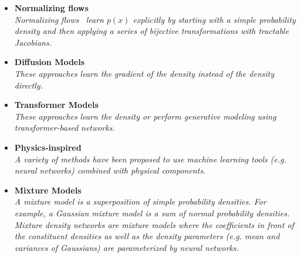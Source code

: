 \documentclass[12pt,letterpaper]{article}
\begin{document}
\begin{itemize}
\begin{itemize}
		\item \textbf{Normalizing flows}~\cite{Albergo:2019eim,1800956,Kanwar:2003.06413,Brehmer:2020vwc,Bothmann:2020ywa,Gao:2020zvv,Gao:2020vdv,Nachman:2020lpy,Choi:2020bnf,Lu:2020npg,Bieringer:2020tnw,Hollingsworth:2021sii,Winterhalder:2021ave,Krause:2021ilc,Hackett:2021idh,Menary:2021tjg,Hallin:2021wme,NEURIPS2020_a878dbeb,Vandegar:2020yvw,Jawahar:2021vyu,Bister:2021arb,Krause:2021wez,Butter:2021csz,Winterhalder:2021ngy,Butter:2022lkf,Verheyen:2022tov,Leigh:2022lpn,Chen:2022ytr,Albandea:2022fky,Krause:2022jna,Cresswell:2022tof,Kach:2022qnf,Kach:2022uzq,Dolan:2022ikg,Backes:2022vmn,Heimel:2022wyj,Albandea:2023wgd,Rousselot:2023pcj,Diefenbacher:2023vsw,Nicoli:2023qsl,R:2023dcr,Nachman:2023clf,Raine:2023fko,Golling:2023yjq,Wen:2023oju,Xu:2023xdc,Singha:2023xxq,Buckley:2023rez,Pang:2023wfx,Golling:2023mqx,Reyes-Gonzalez:2023oei,Bickendorf:2023nej,Finke:2023ltw,Bright-Thonney:2023sqf,Albandea:2023ais,Pham:2023bnl,Gavranovic:2023oam}
		\\\textit{Normalizing flows~\cite{pmlr-v37-rezende15} learn $p(x)$ explicitly by starting with a simple probability density and then applying a series of bijective transformations with tractable Jacobians.}
		\item \textbf{Diffusion Models}~\cite{Mikuni:2022xry,Leigh:2023toe,Mikuni:2023dvk,Shmakov:2023kjj,Buhmann:2023bwk,Butter:2023fov,Mikuni:2023tok,Acosta:2023zik,Leigh:2023zle,Imani:2023blb,Amram:2023onf,Diefenbacher:2023flw,Cotler:2023lem,Diefenbacher:2023wec,Mikuni:2023tqg,Hunt-Smith:2023ccp,Buhmann:2023kdg,Buhmann:2023zgc,Buhmann:2023acn,Devlin:2023jzp}
		\\\textit{These approaches learn the gradient of the density instead of the density directly.}
		\item \textbf{Transformer Models}~\cite{Finke:2023veq,Butter:2023fov,Raine:2023fko,Tomiya:2023jdy}
		\\\textit{These approaches learn the density or perform generative modeling using transformer-based networks.}
		\item \textbf{Physics-inspired}~\cite{Andreassen:2018apy,Andreassen:2019txo,1808876,Lai:2020byl,Barenboim:2021vzh,Larkoski:2023xam}
		\\\textit{A variety of methods have been proposed to use machine learning tools (e.g. neural networks) combined with physical components.}
		\item \textbf{Mixture Models}~\cite{Chen:2020uds,Burton:2021tsd,Graziani:2021vai,Liu:2022dem,Vermunt:2023fsr}
		\\\textit{A mixture model is a superposition of simple probability densities.  For example, a Gaussian mixture model is a sum of normal probability densities.  Mixture density networks are mixture models where the coefficients in front of the constituent densities as well as the density parameters (e.g. mean and variances of Gaussians) are parameterized by neural networks.}

\end{itemize}
\end{itemize}
\end{document}
